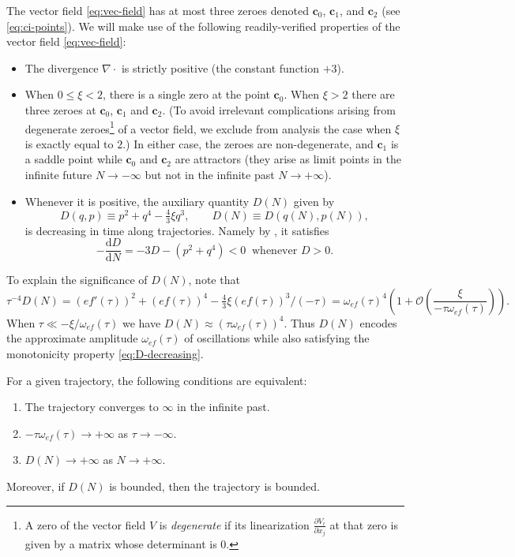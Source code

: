 The vector field \eqref{eq:vec-field} has at most three zeroes denoted $\mathbf{c}_{0}$, $\mathbf{c}_{1}$, and $\mathbf{c}_{2}$ (see \eqref{eq:ci-points}). We will make use of the following readily-verified properties of the vector field \eqref{eq:vec-field}:
\begin{itemize}
\item The divergence $\nabla\cdot$ is strictly positive (the constant function $+3$). 
\item When $0\leq\xi<2$, there is a single zero at the point $\mathbf{c}_{0}$. When $\xi>2$ there are three zeroes at $\mathbf{c}_{0}$, $\mathbf{c}_{1}$ and $\mathbf{c}_{2}$. (To avoid irrelevant complications arising from degenerate zeroes\footnote{A zero of the vector field $V$ is \emph{degenerate} if its linearization $\frac{\partial V_{i}}{\partial x_{j}}$ at that zero is given by a matrix whose determinant is $0$.} of a vector field, we exclude from analysis the case when $\xi$ is exactly equal to $2$.) In either case, the zeroes are non-degenerate, and $\mathbf{c}_{1}$ is a saddle point while $\mathbf{c}_{0}$ and $\mathbf{c}_{2}$ are attractors (they arise as limit points in the infinite future $N\to-\infty$ but not in the infinite past $N\to+\infty$). 
\item Whenever it is positive, the auxiliary quantity $D(N)$ given by 
\begin{equation}
D(q,p)\equiv p^{2}+q^{4}-\tfrac{4}{3}\xi q^{3},\qquad D(N)\equiv D(q(N),p(N)),\label{eq:def-D}
\end{equation}
 is decreasing in time along trajectories. Namely by , it satisfies 
\begin{equation}
-\frac{\mathrm{d}D}{\mathrm{d}N}=-3D-(p^{2}+q^{4})<0\ \textrm{ whenever }D>0.\label{eq:D-decreasing}
\end{equation}
\end{itemize}
To explain the significance of $D(N)$, note that 
\begin{equation}
\tau^{-4}D(N)=\left(ef'(\tau)\right)^{2}+\left(ef(\tau)\right)^{4}-\tfrac{4}{3}\xi(ef(\tau))^{3}/(-\tau)=\omega_{ef}(\tau)^{4}\left(1+\mathcal{O}\left(\frac{\xi}{-\tau\omega_{ef}(\tau)}\right)\right).\label{eq:DN-asymptotic}
\end{equation}
 When $\tau\ll-\xi/\omega_{ef}(\tau)$ we have $D(N)\approx(\tau\omega_{ef}(\tau))^{4}$. Thus $D(N)$ encodes the approximate amplitude $\omega_{ef}(\tau)$ of oscillations while also satisfying the monotonicity property \eqref{eq:D-decreasing}.  
\begin{lem}
\label{lem:oscillation-condition}For a given trajectory, the following conditions are equivalent:
\begin{enumerate}
\item \label{enu:inf-past-trajectory-infinity}The trajectory converges to $\bm{\infty}$ in the infinite past.
\item \label{enu:inf-past--tomega-infinity}$-\tau\omega_{ef}(\tau)\to+\infty$ as $\tau\to-\infty$. 
\item \label{enu:inf-past-D-infinity}$D(N)\to+\infty$ as $N\to+\infty$. 
\end{enumerate}
Moreover, if $D(N)$ is bounded, then the trajectory is bounded.
\end{lem}

